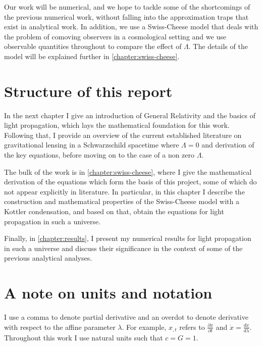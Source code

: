 Our work will be numerical, and we hope to tackle some of the shortcomings of the previous numerical work, without falling into the approximation traps that exist in analytical work. In addition, we use a Swiss-Cheese model that deals with the problem of comoving observers in a cosmological setting and we use observable quantities throughout to compare the effect of $\Lambda$. The details of the model will be explained further in \autoref{chapter:swiss-cheese}.

\section{Structure of this report}
In the next chapter I give an introduction of General Relativity and the basics of light propagation, which lays the mathematical foundation for this work. Following that, I provide an overview of the current established literature on gravitational lensing in a Schwarzschild spacetime where $\Lambda = 0$ and derivation of the key equations, before moving on to the case of a non zero $\Lambda$. 

The bulk of the work is in \autoref{chapter:swiss-cheese}, where I give the mathematical derivation of the equations which form the basis of this project, some of which do not appear explicitly in literature. In particular, in this chapter I describe the construction and mathematical properties of the Swiss-Cheese model with a Kottler condensation, and based on that, obtain the equations for light propagation in such a universe. 

Finally, in \autoref{chapter:results}, I present my numerical results for light propagation in such a universe and discuss their significance in the context of some of the previous analytical analyses. 

\section{A note on units and notation}
I use a comma to denote partial derivative and an overdot to denote derivative with respect to the affine parameter $\lambda$. For example, $x_{,t}$ refers to $\frac{\partial x}{\partial t}$ and $\dot{x} = \frac{dx}{d\lambda}$. Throughout this work I use natural units such that $c = G = 1$. 
